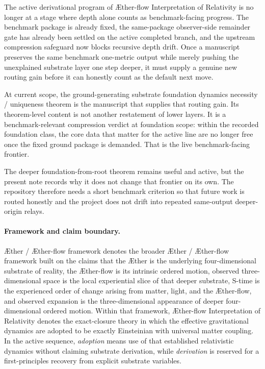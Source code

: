 \documentclass[11pt]{article}
\newcommand{\Aether}{\AE{}ther}
\newcommand{\Aflow}{\AE{}ther-flow}
\newcommand{\TheoryName}{\Aflow{} Interpretation of Relativity}
\newcommand{\TheoryProgram}{\Aether{} / \Aflow{} framework}
\begin{document}
The active derivational program of \TheoryName{} is no longer at a stage where depth alone counts as benchmark-facing progress. The benchmark package is already fixed, the same-package observer-side remainder gate has already been settled on the active completed branch, and the upstream compression safeguard now blocks recursive depth drift. Once a manuscript preserves the same benchmark one-metric output while merely pushing the unexplained substrate layer one step deeper, it must supply a genuine new routing gain before it can honestly count as the default next move.

At current scope, the ground-generating substrate foundation dynamics necessity / uniqueness theorem is the manuscript that supplies that routing gain. Its theorem-level content is not another restatement of lower layers. It is a benchmark-relevant compression verdict at foundation scope: within the recorded foundation class, the core data that matter for the active line are no longer free once the fixed ground package is demanded. That is the live benchmark-facing frontier.

The deeper foundation-from-root theorem remains useful and active, but the present note records why it does not change that frontier on its own. The repository therefore needs a short benchmark criterion so that future work is routed honestly and the project does not drift into repeated same-output deeper-origin relays.

\paragraph{Framework and claim boundary.}
\TheoryProgram{} denotes the broader \Aether{} / \Aflow{} framework built on the claims that the \Aether{} is the underlying four-dimensional substrate of reality, the \Aflow{} is its intrinsic ordered motion, observed three-dimensional space is the local experiential slice of that deeper substrate, S-time is the experienced order of change arising from matter, light, and the \Aflow{}, and observed expansion is the three-dimensional appearance of deeper four-dimensional ordered motion. Within that framework, \TheoryName{} denotes the exact-closure theory in which the effective gravitational dynamics are adopted to be exactly Einsteinian with universal matter coupling. In the active sequence, \emph{adoption} means use of that established relativistic dynamics without claiming substrate derivation, while \emph{derivation} is reserved for a first-principles recovery from explicit substrate variables.
\end{document}
